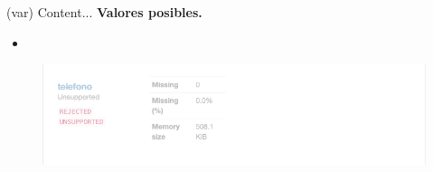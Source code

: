 
\begin{variable}(var) 
Content... 
\bigbreak 
\textbf{Valores posibles.}
\begin{itemize}
	\item 
\end{itemize}
\begin{figure}[H]
	\centering
	\includegraphics[scale=0.5]{Images/17}
\end{figure}
\end{variable}
















